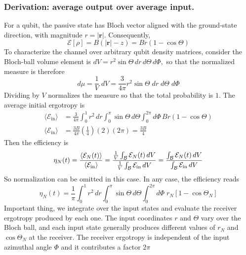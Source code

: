 \documentclass[../../../main.tex]{subfiles}
\begin{document}
\subsubsection{Derivation: average output over average input.}
For a qubit, the passive state has Bloch vector aligned with the ground-state direction, with magnitude \(r=|\mathbf r|\).
Consequently,
\begin{equation*}
  \mathcal E[\rho]=B(|\mathbf r|-z) = Br(1-\cos\Theta)
\end{equation*}
To characterize the channel over arbitrary qubit density matrices, consider the  Bloch-ball volume element is $dV=r^2\sin\Theta\,dr\,d\Theta\,d\Phi,$ so that the normalized measure is therefore
\begin{equation*}
  d\mu = \frac{1 }{V }\;dV = \frac{3}{4\pi}r^2\sin\Theta\;dr\;d\Theta\;d\Phi
\end{equation*}
Dividing by \(V\)  normalizes the measure so that the total probability is \(1\).
The average initial ergotropy is
\begin{align*}
  \langle\mathcal E_{\mathrm{in}}\rangle
   & =\frac{3}{4\pi}\int_0^1r^2\,dr\int_0^\pi\sin\Theta\,d\Theta\int_0^{2\pi}d\Phi\,Br(1-\cos\Theta) \\
  \langle\mathcal E_{\mathrm{in}}\rangle
   & =\frac{3B}{4\pi}\left(\frac14\right)(2)(2\pi)=\frac{3B}{4}
\end{align*}
Then the efficiency is
\begin{equation*}
  \eta_N(t)
=\frac{\langle\mathcal E_N(t)\rangle}
{\langle\mathcal E_{\mathrm{in}}\rangle}
=\frac{\frac{1}{V}\int_{\mathcal B}\mathcal E_N(t)\,dV}
{\frac{1}{V}\int_{\mathcal B}\mathcal E_{\mathrm{in}}\,dV}\\[2pt]
= \frac{\int_{\mathcal B}\mathcal E_N(t)\,dV}
{\int_{\mathcal B}\mathcal E_{\mathrm{in}}\,dV}
\end{equation*}
So normalization can be omitted in this case.
In any case, the efficiency reads 
\begin{equation*}
\eta_N(t) =  \frac{1}{\pi}\int_0^1r^2\,dr\int_0^\pi\sin\Theta\,d\Theta\int_0^{2\pi}d\Phi\; r_N\left[1-\cos\Theta_N\right]
\end{equation*}
Important thing, we integrate over the input states and evaluate the receiver ergotropy produced by each one.
The input coordinates \(r\) and \(\Theta\) vary over the Bloch ball, and each input state generally produces different values of \(r_N\) and \(\cos\Theta_N\) at the receiver.
The receiver ergotropy is independent of the input azimuthal angle \(\Phi\) and it  contributes a factor \(2\pi\)
\end{document}

